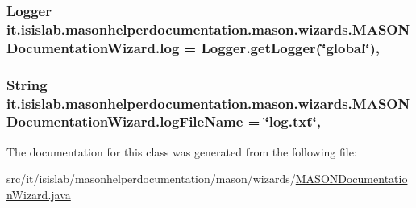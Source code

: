 \hypertarget{classit_1_1isislab_1_1masonhelperdocumentation_1_1mason_1_1wizards_1_1_m_a_s_o_n_documentation_wizard_ad7cf684a5c448aa057721a59401e2a5d}{
\subsubsection[{log}]{\setlength{\rightskip}{0pt plus 5cm}Logger it.\-isislab.\-masonhelperdocumentation.\-mason.\-wizards.\-M\-A\-S\-O\-N\-Documentation\-Wizard.\-log = Logger.\-get\-Logger(\char`\"{}global\char`\"{})\hspace{0.3cm}{\ttfamily [static]}, {\ttfamily [private]}}}\label{classit_1_1isislab_1_1masonhelperdocumentation_1_1mason_1_1wizards_1_1_m_a_s_o_n_documentation_wizard_ad7cf684a5c448aa057721a59401e2a5d}
\hypertarget{classit_1_1isislab_1_1masonhelperdocumentation_1_1mason_1_1wizards_1_1_m_a_s_o_n_documentation_wizard_a8cff8f361185fdae7ef6d181e2bef353}{
\subsubsection[{log\-File\-Name}]{\setlength{\rightskip}{0pt plus 5cm}String it.\-isislab.\-masonhelperdocumentation.\-mason.\-wizards.\-M\-A\-S\-O\-N\-Documentation\-Wizard.\-log\-File\-Name = \char`\"{}log.\-txt\char`\"{}\hspace{0.3cm}{\ttfamily [static]}, {\ttfamily [private]}}}\label{classit_1_1isislab_1_1masonhelperdocumentation_1_1mason_1_1wizards_1_1_m_a_s_o_n_documentation_wizard_a8cff8f361185fdae7ef6d181e2bef353}


The documentation for this class was generated from the following file\-:\begin{DoxyCompactItemize}
\item 
src/it/isislab/masonhelperdocumentation/mason/wizards/\hyperlink{_m_a_s_o_n_documentation_wizard_8java}{M\-A\-S\-O\-N\-Documentation\-Wizard.\-java}\end{DoxyCompactItemize}
